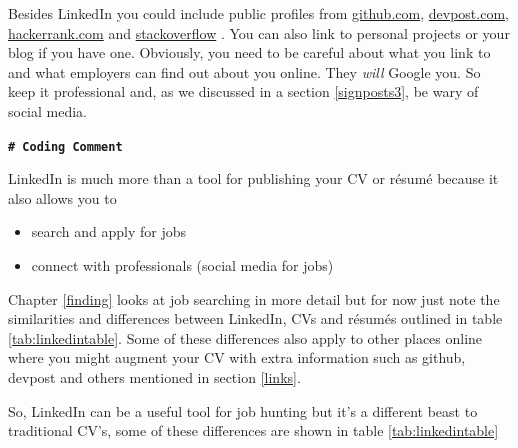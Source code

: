 \documentclass[
]{book}
\providecommand{\tightlist}{%
  \setlength{\itemsep}{0pt}\setlength{\parskip}{0pt}}
\begin{document}
Besides LinkedIn you could include public profiles from \href{https://docs.github.com/en/free-pro-team@latest/github/setting-up-and-managing-your-github-profile/about-your-profile}{github.com}, \href{https://help.devpost.com/hc/en-us/articles/360021734632-Update-your-profile-and-username}{devpost.com}, \href{https://www.hackerrank.com/leaderboard}{hackerrank.com} and \href{https://medium.com/@rhamedy/contribution-debt-why-how-to-contribute-to-stack-overflow-a69d4bd50d0c}{stackoverflow} \citep{stackoverflow}. You can also link to personal projects or your blog if you have one. Obviously, you need to be careful about what you link to and what employers can find out about you online. They \emph{will} Google you. So keep it professional and, as we discussed in a section \ref{signposts3}, be wary of social media.

\textbf{\texttt{\#\ Coding\ Comment}}

LinkedIn is much more than a tool for publishing your CV or résumé because it also allows you to

\begin{itemize}
\tightlist
\item
  search and apply for jobs
\item
  connect with professionals (social media for jobs)
\end{itemize}

Chapter \ref{finding} looks at job searching in more detail but for now just note the similarities and differences between LinkedIn, CVs and résumés outlined in table \ref{tab:linkedintable}. Some of these differences also apply to other places online where you might augment your CV with extra information such as github, devpost and others mentioned in section \ref{links}.

So, LinkedIn can be a useful tool for job hunting but it's a different beast to traditional CV's, some of these differences are shown in table \ref{tab:linkedintable}
\end{document}
